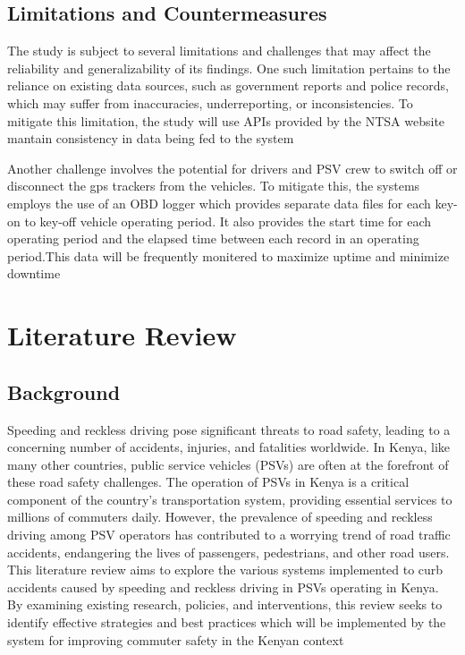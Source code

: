 \documentclass[a4paper, 12pt]{report}
\begin{document}
\section{Limitations and Countermeasures}
\noindent The study is subject to several limitations and challenges that may affect the reliability and generalizability of its findings. One such limitation pertains to the
reliance on existing data sources, such as government reports and police records,
which may suffer from inaccuracies, underreporting, or inconsistencies. To mitigate this limitation, the study will use APIs provided by the NTSA website mantain consistency in data being fed to the system\par
\noindent Another challenge involves the potential for drivers and PSV crew to switch off
or disconnect the gps trackers from the vehicles. To mitigate this, the systems
employs the use of an OBD logger which provides separate data files for each
key-on to key-off vehicle operating period. It also provides the start time for
each operating period and the elapsed time between each record in an operating
period.This data will be frequently monitered to maximize uptime and minimize downtime

\chapter{Literature Review}
\section{Background}
\noindent Speeding and reckless driving pose significant threats to road safety, leading to
a concerning number of accidents, injuries, and fatalities worldwide. In Kenya,
like many other countries, public service vehicles (PSVs) are often at the forefront
of these road safety challenges. The operation of PSVs in Kenya is a critical
component of the country's transportation system, providing essential services to
millions of commuters daily. However, the prevalence of speeding and reckless
driving among PSV operators has contributed to a worrying trend of road traffic
accidents, endangering the lives of passengers, pedestrians, and other road users.
This literature review aims to explore the various systems implemented to curb
accidents caused by speeding and reckless driving in PSVs operating in Kenya.
By examining existing research, policies, and interventions, this review seeks to
identify effective strategies and best practices which will be implemented by the
system for improving commuter safety in the Kenyan context
\end{document}
